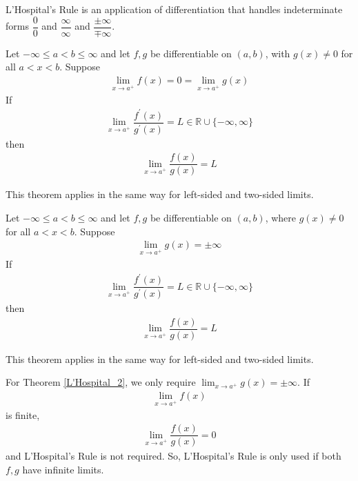 L'Hospital's Rule is an application of differentiation that handles indeterminate forms $\dfrac{0}{0}$ and $\dfrac{\infty}{\infty}$ and $\dfrac{\pm \infty}{\mp \infty}$.

\vspace{0.1in}
\begin{theorem}
Let $-\infty \leq a < b \leq \infty$ and let $f, g$ be differentiable on $(a, b)$, with $g(x) \neq 0$ for all $a < x < b$. Suppose 
\begin{align*}
    \lim_{x \longrightarrow a^{+}} f(x) = 0 = \lim_{x \longrightarrow a^{+}} g(x)
\end{align*}
If
\begin{align*}
    \lim_{x \longrightarrow a^{+}} \dfrac{f^{'}(x)}{g^{'}(x)} = L \in \mathbb{R} \cup \{-\infty, \infty\}
\end{align*}
then
\begin{align*}
    \lim_{x \longrightarrow a^{+}} \dfrac{f(x)}{g(x)} = L
\end{align*}
\label{L'Hospital_1}
\end{theorem}

\begin{note}
This theorem applies in the same way for left-sided and two-sided limits.
\end{note}

\begin{theorem}
Let $-\infty \leq a < b \leq \infty$ and let $f, g$ be differentiable on $(a, b)$, where $g(x) \neq 0$ for all $a < x < b$. Suppose
\begin{align*}
    \lim_{x \longrightarrow a^{+}} g(x) = \pm \infty 
\end{align*}
If
\begin{align*}
    \lim_{x \longrightarrow a^{+}} \dfrac{f^{'}(x)}{g^{'}(x)} = L \in \mathbb{R} \cup \{-\infty, \infty\}
\end{align*}
then
\begin{align*}
    \lim_{x \longrightarrow a^{+}} \dfrac{f(x)}{g(x)} = L
\end{align*}
\label{L'Hospital_2}
\end{theorem}

\begin{note}
This theorem applies in the same way for left-sided and two-sided limits.
\end{note}

\begin{note}
For Theorem \ref{L'Hospital_2}, we only require $\lim_{x \longrightarrow a^{+}} g(x) = \pm \infty$. If 
\begin{align*}
    \lim_{x \longrightarrow a^{+}} f(x)
\end{align*} 
is finite,
\begin{align*}
    \lim_{x \longrightarrow a^{+}} \dfrac{f(x)}{g(x)} = 0
\end{align*}
and L'Hospital's Rule is not required. So, L'Hospital's Rule is only used if both $f, g$ have infinite limits.
\end{note}


